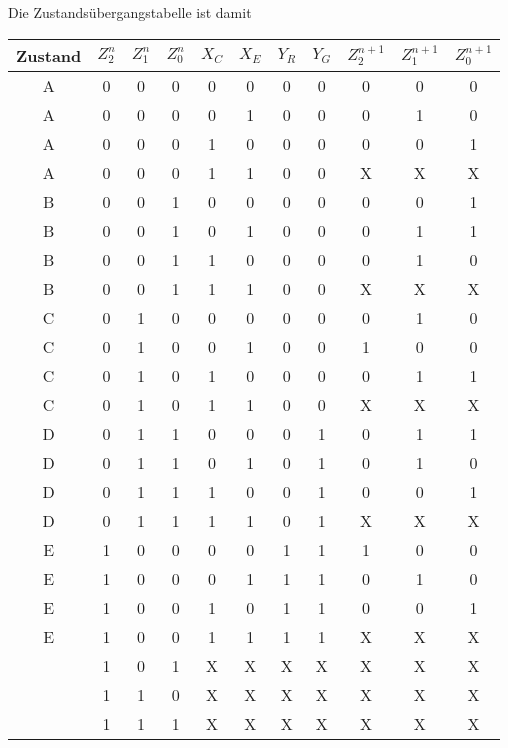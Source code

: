 \documentclass{CInf_practice}
\begin{document}
Die Zustandsübergangstabelle ist damit
\begin{center}
   \addtolength{\tabcolsep}{-3pt}
   \begin{tabular}{cccc|cc|cc|ccc}
      \hline
      Zustand & $Z_2^n$ & $Z_1^n$ & $Z_0^n$ & $X_C$ & $X_E$ & $Y_R$ & $Y_G$ &
      $Z_2^{n+1}$ & $Z_1^{n+1}$ & $Z_0^{n+1}$\\
      \hline\hline
      A & 0 & 0 & 0 & 0 & 0 & 0 & 0 & 0 & 0 & 0 \\
      A & 0 & 0 & 0 & 0 & 1 & 0 & 0 & 0 & 1 & 0 \\
      A & 0 & 0 & 0 & 1 & 0 & 0 & 0 & 0 & 0 & 1 \\
      A & 0 & 0 & 0 & 1 & 1 & 0 & 0 & X & X & X \\\hline

      B & 0 & 0 & 1 & 0 & 0 & 0 & 0 & 0 & 0 & 1 \\
      B & 0 & 0 & 1 & 0 & 1 & 0 & 0 & 0 & 1 & 1 \\
      B & 0 & 0 & 1 & 1 & 0 & 0 & 0 & 0 & 1 & 0 \\
      B & 0 & 0 & 1 & 1 & 1 & 0 & 0 & X & X & X \\\hline

      C & 0 & 1 & 0 & 0 & 0 & 0 & 0 & 0 & 1 & 0 \\
      C & 0 & 1 & 0 & 0 & 1 & 0 & 0 & 1 & 0 & 0 \\
      C & 0 & 1 & 0 & 1 & 0 & 0 & 0 & 0 & 1 & 1 \\
      C & 0 & 1 & 0 & 1 & 1 & 0 & 0 & X & X & X \\\hline

      D & 0 & 1 & 1 & 0 & 0 & 0 & 1 & 0 & 1 & 1 \\
      D & 0 & 1 & 1 & 0 & 1 & 0 & 1 & 0 & 1 & 0 \\
      D & 0 & 1 & 1 & 1 & 0 & 0 & 1 & 0 & 0 & 1 \\
      D & 0 & 1 & 1 & 1 & 1 & 0 & 1 & X & X & X \\\hline

      E & 1 & 0 & 0 & 0 & 0 & 1 & 1 & 1 & 0 & 0 \\
      E & 1 & 0 & 0 & 0 & 1 & 1 & 1 & 0 & 1 & 0 \\
      E & 1 & 0 & 0 & 1 & 0 & 1 & 1 & 0 & 0 & 1 \\
      E & 1 & 0 & 0 & 1 & 1 & 1 & 1 & X & X & X \\\hline

        & 1 & 0 & 1 & X & X & X & X & X & X & X \\
        & 1 & 1 & 0 & X & X & X & X & X & X & X \\
        & 1 & 1 & 1 & X & X & X & X & X & X & X \\\hline
   \end{tabular}
\end{center}
\end{document}
